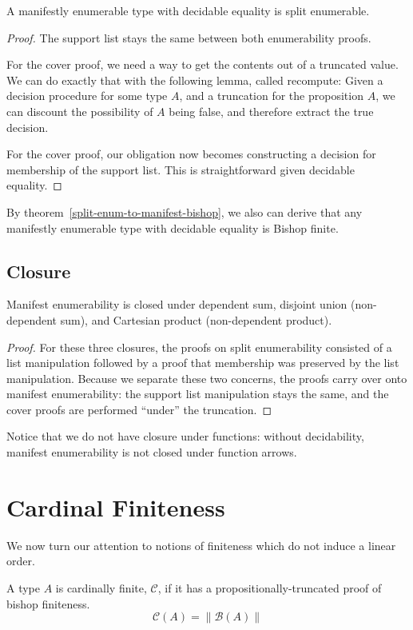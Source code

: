 \begin{rm-theorem} \label{manifest-enum-to-split}
  A manifestly enumerable type with decidable equality is split enumerable.
\end{rm-theorem}
\begin{proof}
  The support list stays the same between both enumerability proofs.

  For the cover proof, we need a way to get the contents out of a truncated
  value.
  We can do exactly that with the following lemma, called recompute:
  Given a decision procedure for some type \(A\), and a truncation for the
  proposition \(A\), we can discount the possibility of \(A\) being false, and
  therefore extract the true decision.

  For the cover proof, our obligation now becomes constructing a decision for
  membership of the support list.
  This is straightforward given decidable equality.

\end{proof}
By theorem~\ref{split-enum-to-manifest-bishop}, we also can derive that any
manifestly enumerable type with decidable equality is Bishop finite.
\subsection{Closure}
\begin{rm-lemma}
  Manifest enumerability is closed under dependent sum, disjoint union
  (non-dependent sum), and Cartesian product (non-dependent product).
\end{rm-lemma}
\begin{proof}
  For these three closures, the proofs on split enumerability consisted of a
  list manipulation followed by a proof that membership was preserved by the
  list manipulation.
  Because we separate these two concerns, the proofs carry over onto manifest
  enumerability: the support list manipulation stays the same, and the
  cover proofs are performed ``under'' the truncation.
\end{proof}
Notice that we do not have closure under functions: without decidability,
manifest enumerability is not closed under function arrows.
\section{Cardinal Finiteness} \label{cardinal}
We now turn our attention to notions of finiteness which do not induce a linear
order.
\begin{rm-definition}
  A type \(A\) is cardinally finite, \(\mathcal{C}\), if it has a
  propositionally-truncated proof of bishop finiteness.
  \begin{equation}
    \mathcal{C}(A) = \lVert \mathcal{B}(A) \rVert
  \end{equation}
\end{rm-definition}
